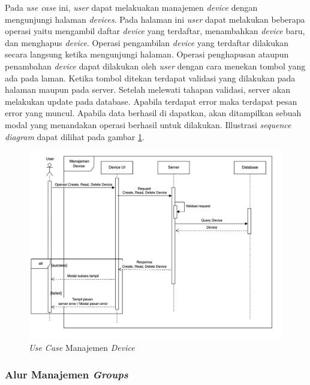 Pada \textit{use case} ini, \textit{user} dapat melakuakan manajemen \textit{device} dengan mengunjungi halaman \textit{devices}. Pada halaman ini \textit{user} dapat melakukan beberapa operasi yaitu mengambil daftar \textit{device} yang terdaftar, menambahkan \textit{device} baru, dan menghapus \textit{device}. Operasi pengambilan \textit{device} yang terdaftar dilakukan secara langsung ketika mengunjungi halaman. Operasi penghapusan ataupun penambahan \textit{device} dapat dilakukan oleh \textit{user} dengan cara menekan tombol yang ada pada laman. Ketika tombol ditekan terdapat validasi yang dilakukan pada halaman maupun pada server. Setelah melewati tahapan validasi, server akan melakukan update pada database. Apabila terdapat error maka terdapat pesan error yang muncul. Apabila data berhasil di dapatkan, akan ditampilkan sebuah modal yang menandakan operasi berhasil untuk dilakukan. Illustrasi \textit{sequence diagram} dapat dilihat pada gambar \ref{fig:usecase-08}.


\begin{figure}[ht]
  \centering
  \includegraphics[width=1\textwidth]{resources/chapter-3/usecase/uc-08.jpg}
  \caption{\textit{Use Case} Manajemen \textit{Device}}
  \label{fig:usecase-08}
\end{figure}

\pagebreak

\subsubsection{Alur Manajemen \textit{Groups}}

